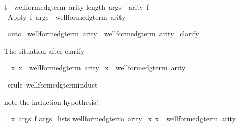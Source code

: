 \begin{isabellebody}
\begin{isamarkuptxt}
\begin{isabelle}
t\ {\isasymin}\ well{\isacharunderscore}formed{\isacharunderscore}gterm{\isacharprime}\ arity{\isacharsemicolon}\isanewline
{}length\ args\ {\isacharequal}\ arity\ f{\isasymrbrakk}\isanewline
{}\ Apply\ f\ args\ {\isasymin}\ well{\isacharunderscore}formed{\isacharunderscore}gterm{\isacharprime}\ arity%
\end{isabelle}%
\end{isamarkuptxt}%
\ auto\isanewline
{}\isanewline
\isanewline
\isanewline
\isanewline
{}\ {\isachardoublequote}well{\isacharunderscore}formed{\isacharunderscore}gterm{\isacharprime}\ arity\ {\isasymsubseteq}\ well{\isacharunderscore}formed{\isacharunderscore}gterm\ arity{\isachardoublequote}\isanewline
{}\ clarify%
\begin{isamarkuptxt}%
The situation after clarify
\begin{isabelle}%
\ {}{\isachardot}\ {\isasymAnd}x{\isachardot}\ x\ {\isasymin}\ well{\isacharunderscore}formed{\isacharunderscore}gterm{\isacharprime}\ arity\ {\isasymLongrightarrow}\isanewline
{}x\ {\isasymin}\ well{\isacharunderscore}formed{\isacharunderscore}gterm\ arity%
\end{isabelle}%
\end{isamarkuptxt}%
\ {\isacharparenleft}erule\ well{\isacharunderscore}formed{\isacharunderscore}gterm{\isacharprime}{\isachardot}induct{\isacharparenright}%
\begin{isamarkuptxt}%
note the induction hypothesis!
\begin{isabelle}%
\ {}{\isachardot}\ {\isasymAnd}x\ args\ f{\isachardot}\isanewline
{}args\isanewline
{}\ lists\isanewline
{}well{\isacharunderscore}formed{\isacharunderscore}gterm{\isacharprime}\ arity\ {\isasyminter}\isanewline
{}x{\isachardot}\ x\ {\isasymin}\ well{\isacharunderscore}formed{\isacharunderscore}gterm\ arity{\isacharbraceright}{\isacharparenright}{\isacharsemicolon}\isanewline

\end{isabelle}
\end{isamarkuptxt}
\end{isabellebody}
